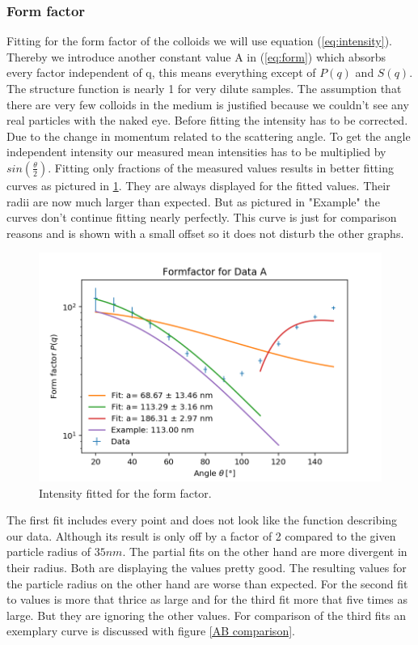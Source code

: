 \documentclass[]{article}
\begin{document}
\subsubsection{Form factor}

Fitting for the form factor of the colloids we will use equation (\ref{eq:intensity}). Thereby we introduce another constant value A in (\ref{eq:form}) which absorbs every factor independent of q, this means everything except of $P(q)$ and $S(q)$. The structure function is nearly 1 for very dilute samples. The assumption that there are very few colloids in the medium is justified because we couldn't see any real particles with the naked eye. 
Before fitting the intensity has to be corrected. Due to the change in momentum related to the scattering angle. To get the angle independent intensity our measured mean intensities has to be multiplied by $sin(\frac{\theta}{2} )$.
Fitting only fractions of the measured values results in better fitting curves as pictured in \ref{FormA}. They are always displayed for the fitted values. Their radii are now much larger than expected. But as pictured in "Example" the curves don't continue fitting nearly perfectly. This curve is just for comparison reasons and is shown with a small offset so it does not disturb the other graphs. 

\begin{figure}[!htbp]
\centering
\includegraphics[width=0.8\linewidth]{Plots/FormA.png}
\caption{Intensity fitted for the form factor.}
\label{FormA}
\end{figure}

The first fit includes every point and does not look like the function describing our data. Although its result is only off by a factor of 2 compared to the given particle radius of $35nm$. The partial fits on the other hand are more divergent in their radius. Both are displaying the values pretty good. The resulting values for the particle radius on the other hand are worse than expected. For the second fit to values is more that thrice as large and for the third fit more that five times as large. But they are ignoring the other values. For comparison of the third fits an exemplary curve is discussed with figure \ref{AB comparison}. 
\end{document}
